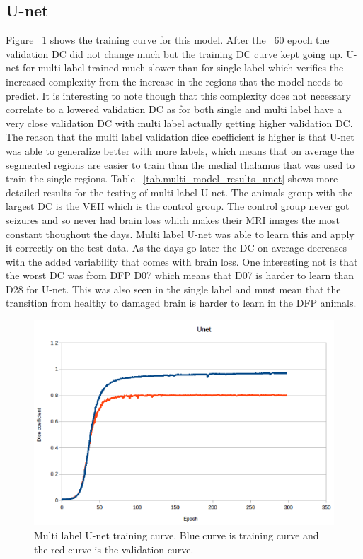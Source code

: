 \subsection{U-net}
    Figure ~\ref{fig:results_multi_unet_train} shows the training curve for this model.
    After the ~60 epoch the validation DC did not change much but the training DC curve kept going up. 
    U-net for multi label trained much slower than for single label which verifies the increased complexity from the increase in the regions that the model needs to predict. 
    It is interesting to note though that this complexity does not necessary correlate to a lowered validation DC as for both single and multi label have a very close validation DC with multi label actually getting higher validation DC.
    The reason that the multi label validation dice coefficient is higher is that U-net was able to generalize better with more labels, which means that on average the segmented regions are easier to train than the medial thalamus that was used to train the single regions. 
    Table ~\ref{tab.multi_model_results_unet} shows more detailed results for the testing of multi label U-net. 
    The animals group with the largest DC is the VEH which is the control group.
    The control group never got seizures and so never had brain loss which makes their MRI images the most constant thoughout the days. 
    Multi label U-net was able to learn this and apply it correctly on the test data.
    As the days go later the DC on average decreases with the added variability that comes with brain loss.
    One interesting not is that the worst DC was from DFP D07 which means that D07 is harder to learn than D28 for U-net. 
    This was also seen in the single label and must mean that the transition from healthy to damaged brain is harder to learn in the DFP animals. 
     


\begin{figure}[!tbh]
\centering
\includegraphics[width=\textwidth]{results/train_results_multi_unet.png}
\caption{Multi label U-net training curve. Blue curve is training curve and the red curve is the validation curve. }
\label{fig:results_multi_unet_train}
\end{figure}

